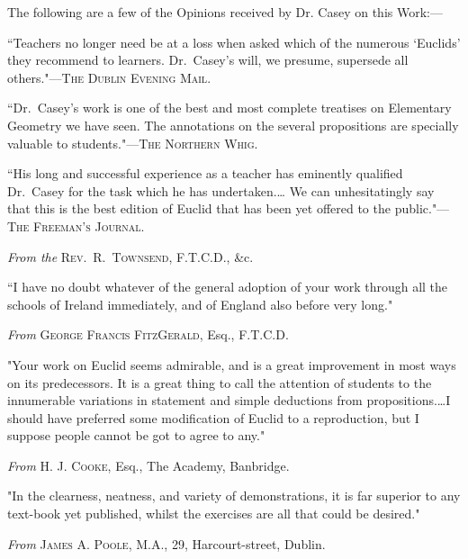 \documentclass[oneside]{book}
\begin{document}
The following are a few of the Opinions received by
Dr. Casey on this Work:---

\begin{footnotesize}
\medskip
``Teachers no longer need be at a loss when asked which of
the numerous `Euclids' they recommend to learners. Dr.~Casey's
will, we presume, supersede all others."---\textsc{The Dublin Evening
Mail}.

\medskip
``Dr.~Casey's work is one of the best and most complete
treatises on Elementary Geometry we have seen. The annotations
on the several propositions are specially valuable to students."---\textsc{The
Northern Whig}.

\medskip
``His long and successful experience as a teacher has eminently
qualified Dr.~Casey for the task which he has undertaken.\ldots
We can unhesitatingly say that this is the best edition of Euclid
that has been yet offered to the public."---\textsc{The Freeman's
Journal}.

\medskip
\begin{center}
\textit{From the} \textsc{Rev.\ R.~Townsend, F.T.C.D.}, \&c.
\end{center}
\nopagebreak

``I have no doubt whatever of the general adoption of your
work through all the schools of Ireland immediately, and of
England also before very long."


\medskip
\begin{center}
\textit{From} \textsc{George Francis FitzGerald}, Esq., F.T.C.D.
\end{center}
\nopagebreak

"Your work on Euclid seems admirable, and is a great improvement
in most ways on its predecessors. It is a great thing
to call the attention of students to the innumerable variations in
statement and simple deductions from propositions.\ldots I should
have preferred some modification of Euclid to a reproduction, but
I suppose people cannot be got to agree to any."

\pagebreak
\begin{center}
\textit{From} \textsc{H. J. Cooke}, Esq., The Academy, Banbridge.
\end{center}
\nopagebreak

"In the clearness, neatness, and variety of demonstrations, it
is far superior to any text-book yet published, whilst the exercises
are all that could be desired."

\medskip
\begin{center}
\textit{From} \textsc{James A. Poole}, M.A., 29, Harcourt-street, Dublin.
\end{center}
\nopagebreak


\end{footnotesize}
\end{document}
